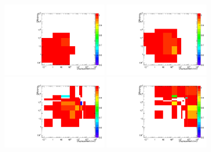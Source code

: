 \begin{figure}[h!]
  \begin{center}
    \includegraphics[width=0.4\textwidth]{figures/LLPResults/systs/trigger/Signal_SignalModels__longLivedAnalyzer__SMS-T1qqqqLL_ctau_10_mGluino-1000_mLSP-200_25ns__eff_trigger_2D_log_num.pdf} 
    \includegraphics[width=0.4\textwidth]{figures/LLPResults/systs/trigger/Signal_SignalModels__longLivedAnalyzer__SMS-T1qqqqLL_ctau_100_mGluino-1000_mLSP-200_25ns__eff_trigger_2D_log_num.pdf} \\
    \includegraphics[width=0.4\textwidth]{figures/LLPResults/systs/trigger/Signal_SignalModels__longLivedAnalyzer__SMS-T1qqqqLL_ctau_1000_mGluino-1000_mLSP-200_25ns__eff_trigger_2D_log_num.pdf} 
    \includegraphics[width=0.4\textwidth]{figures/LLPResults/systs/trigger/Signal_SignalModels__longLivedAnalyzer__SMS-T1qqqqLL_ctau_10000_mGluino-1000_mLSP-200_25ns__eff_trigger_2D_log_num.pdf} \\

\end{center}
\end{figure}
